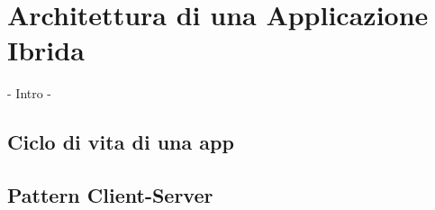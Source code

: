 \chapter{Architettura di una Applicazione Ibrida}
- Intro -
\section{Ciclo di vita di una app}

\section{Pattern Client-Server}